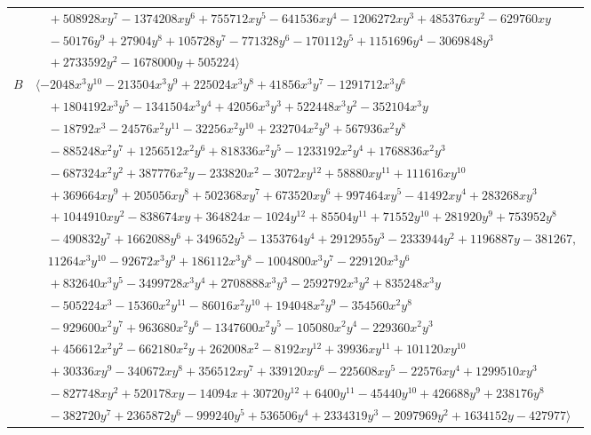 \documentclass[11pt]{article}
\begin{document}
\begin{longtable}{@{}ll@{}}
 & $\quad +508928xy^{7}-1374208xy^{6}+755712xy^{5}-641536xy^{4}-1206272xy^{3}+485376xy^{2}-629760xy$\\
 & $\quad -50176y^{9}+27904y^{8}+105728y^{7}-771328y^{6}-170112y^{5}+1151696y^{4}-3069848y^{3}$\\
 & $\quad +2733592y^{2}-1678000y+505224\rangle$\\
$B$ & $\langle -2048x^{3}y^{10}-213504x^{3}y^{9}+225024x^{3}y^{8}+41856x^{3}y^{7}-1291712x^{3}y^{6}$\\
 & $\quad +1804192x^{3}y^{5}-1341504x^{3}y^{4}+42056x^{3}y^{3}+522448x^{3}y^{2}-352104x^{3}y$\\
 & $\quad -18792x^{3}-24576x^{2}y^{11}-32256x^{2}y^{10}+232704x^{2}y^{9}+567936x^{2}y^{8}$\\
 & $\quad -885248x^{2}y^{7}+1256512x^{2}y^{6}+818336x^{2}y^{5}-1233192x^{2}y^{4}+1768836x^{2}y^{3}$\\
 & $\quad -687324x^{2}y^{2}+387776x^{2}y-233820x^{2}-3072xy^{12}+58880xy^{11}+111616xy^{10}$\\
 & $\quad +369664xy^{9}+205056xy^{8}+502368xy^{7}+673520xy^{6}+997464xy^{5}-41492xy^{4}+283268xy^{3}$\\
 & $\quad +1044910xy^{2}-838674xy+364824x-1024y^{12}+85504y^{11}+71552y^{10}+281920y^{9}+753952y^{8}$\\
 & $\quad -490832y^{7}+1662088y^{6}+349652y^{5}-1353764y^{4}+2912955y^{3}-2333944y^{2}+1196887y-381267,$\\
 & $\quad 11264x^{3}y^{10}-92672x^{3}y^{9}+186112x^{3}y^{8}-1004800x^{3}y^{7}-229120x^{3}y^{6}$\\
 & $\quad +832640x^{3}y^{5}-3499728x^{3}y^{4}+2708888x^{3}y^{3}-2592792x^{3}y^{2}+835248x^{3}y$\\
 & $\quad -505224x^{3}-15360x^{2}y^{11}-86016x^{2}y^{10}+194048x^{2}y^{9}-354560x^{2}y^{8}$\\
 & $\quad -929600x^{2}y^{7}+963680x^{2}y^{6}-1347600x^{2}y^{5}-105080x^{2}y^{4}-229360x^{2}y^{3}$\\
 & $\quad +456612x^{2}y^{2}-662180x^{2}y+262008x^{2}-8192xy^{12}+39936xy^{11}+101120xy^{10}$\\
 & $\quad +30336xy^{9}-340672xy^{8}+356512xy^{7}+339120xy^{6}-225608xy^{5}-22576xy^{4}+1299510xy^{3}$\\
 & $\quad -827748xy^{2}+520178xy-14094x+30720y^{12}+6400y^{11}-45440y^{10}+426688y^{9}+238176y^{8}$\\
 & $\quad -382720y^{7}+2365872y^{6}-999240y^{5}+536506y^{4}+2334319y^{3}-2097969y^{2}+1634152y-427977\rangle$\\

\end{longtable}
\end{document}
